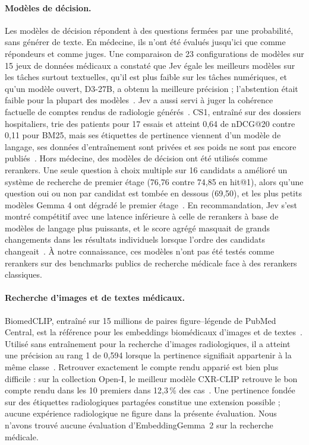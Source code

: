 \documentclass{article}
\begin{document}
\paragraph{Modèles de décision.} Les modèles de décision répondent à des questions fermées par une probabilité, sans générer de texte. En médecine, ils n'ont été évalués jusqu'ici que comme répondeurs et comme juges. Une comparaison de 23 configurations de modèles sur 15 jeux de données médicaux a constaté que Jev égale les meilleurs modèles sur les tâches surtout textuelles, qu'il est plus faible sur les tâches numériques, et qu'un modèle ouvert, D3-27B, a obtenu la meilleure précision ; l'abstention était faible pour la plupart des modèles~\citep{du2026reliable}. Jev a aussi servi à juger la cohérence factuelle de comptes rendus de radiologie générés~\citep{huang2026jevradiology}. CS1, entraîné sur des dossiers hospitaliers, trie des patients pour 17 essais et atteint 0,64 de nDCG@20 contre 0,11 pour BM25, mais ses étiquettes de pertinence viennent d'un modèle de langage, ses données d'entraînement sont privées et ses poids ne sont pas encore publiés~\citep{zhang2026cs1}. Hors médecine, des modèles de décision ont été utilisés comme rerankers. Une seule question à choix multiple sur 16 candidats a amélioré un système de recherche de premier étage (76,76 contre 74,85 en hit@1), alors qu'une question oui ou non par candidat est tombée en dessous (69,50), et les plus petits modèles Gemma 4 ont dégradé le premier étage~\citep{liu2026multimodalrerank}. En recommandation, Jev s'est montré compétitif avec une latence inférieure à celle de rerankers à base de modèles de langage plus puissants, et le score agrégé masquait de grands changements dans les résultats individuels lorsque l'ordre des candidats changeait~\citep{lyu2026decisionrerank}. À notre connaissance, ces modèles n'ont pas été testés comme rerankers sur des benchmarks publics de recherche médicale face à des rerankers classiques.

\paragraph{Recherche d'images et de textes médicaux.} BiomedCLIP, entraîné sur 15 millions de paires figure--légende de PubMed Central, est la référence pour les embeddings biomédicaux d'images et de textes~\citep{zhang2023biomedclip}. Utilisé sans entraînement pour la recherche d'images radiologiques, il a atteint une précision au rang 1 de 0,594 lorsque la pertinence signifiait appartenir à la même classe~\citep{denner2025cbir}. Retrouver exactement le compte rendu apparié est bien plus difficile : sur la collection Open-I, le meilleur modèle CXR-CLIP retrouve le bon compte rendu dans les 10 premiers dans 12,3\,\% des cas~\citep{you2023cxrclip}. Une pertinence fondée sur des étiquettes radiologiques partagées constitue une extension possible ; aucune expérience radiologique ne figure dans la présente évaluation. Nous n'avons trouvé aucune évaluation d'EmbeddingGemma~2 sur la recherche médicale.
\end{document}
